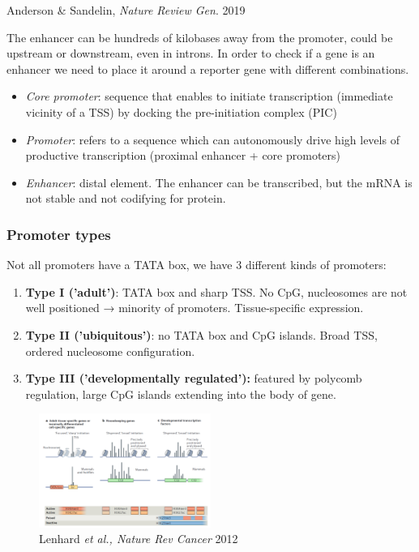 Anderson \& Sandelin, \emph{Nature Review Gen}. 2019

The enhancer can be hundreds of kilobases away from the promoter, could be upstream or downstream, even in introns. In order to check if a gene is an enhancer we need to place it around a reporter gene with different combinations.

\begin{itemize}
\tightlist
\item
  \emph{Core promoter}: sequence that enables to initiate transcription (immediate vicinity of a TSS) by docking the pre-initiation complex (PIC)
\item
  \emph{Promoter}: refers to a sequence which can autonomously drive high levels of productive transcription (proximal enhancer + core promoters)
\item
  \emph{Enhancer}: distal element. The enhancer can be transcribed, but the mRNA is not stable and not codifying for protein.
\end{itemize}

\hypertarget{promoter-types}{%
\subsubsection{\texorpdfstring{\textbf{Promoter types}}{Promoter types}}\label{promoter-types}}

Not all promoters have a TATA box, we have 3 different kinds of promoters:

\begin{enumerate}
\def\labelenumi{\arabic{enumi}.}
\tightlist
\item
  \textbf{Type I ('adult')}: TATA box and sharp TSS. No CpG, nucleosomes are not well positioned → minority of promoters. Tissue-specific expression.
\item
  \textbf{Type II ('ubiquitous')}: no TATA box and CpG islands. Broad TSS, ordered nucleosome configuration.
\item
  \textbf{Type III ('developmentally regulated'):} featured by polycomb regulation, large CpG islands extending into the body of gene.
\end{enumerate}

\begin{figure}
\centering
\includegraphics[width=0.5\textwidth]{../_resources/Screenshot_2022-10-05_at_10-05-59.png}
\caption{Lenhard \emph{et al., Nature Rev Cancer} 2012}
\end{figure}


